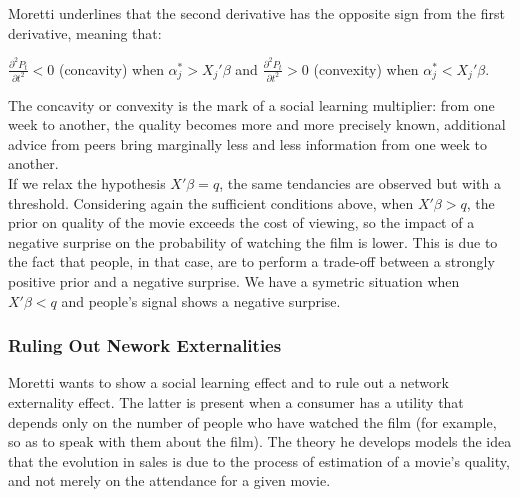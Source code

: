 	Moretti underlines that the second derivative has the opposite sign from the first derivative, meaning that:
	\begin{center}
		$\frac{\partial ^{2} P_{t}}{\partial t^{2}}<0$ (concavity) when $\alpha_{j}^{*}>X_{j}'\beta$ and $\frac{\partial ^{2} P_{t}}{\partial t^{2}}>0$ (convexity) when $\alpha_{j}^{*}<X_{j}'\beta$.
	\end{center}
	The concavity or convexity is the mark of a social learning multiplier: from one week to another, the quality becomes more and more precisely known, additional advice from peers bring marginally less and less information from one week to another.\\
	If we relax the hypothesis $X'\beta=q$, the same tendancies are observed but with a threshold. Considering again the sufficient conditions above, when $X'\beta>q$, the prior on quality of the movie exceeds the cost of viewing, so the impact of a negative surprise on the probability of watching the film is lower. This is due to the fact that people, in that case, are to perform a trade-off between a strongly positive prior and a negative surprise. We have a symetric situation when $X'\beta<q$ and people's signal shows a negative surprise.
	
	\subsubsection{Ruling Out Nework Externalities}
	Moretti wants to show a social learning effect and to rule out a network externality effect. The latter is present when a consumer has a utility that depends only on the number of people who have watched the film (for example, so as to speak with them about the film). The theory he develops models the idea that the evolution in sales is due to the process of estimation of a movie's quality, and not merely on the attendance for a given movie.
